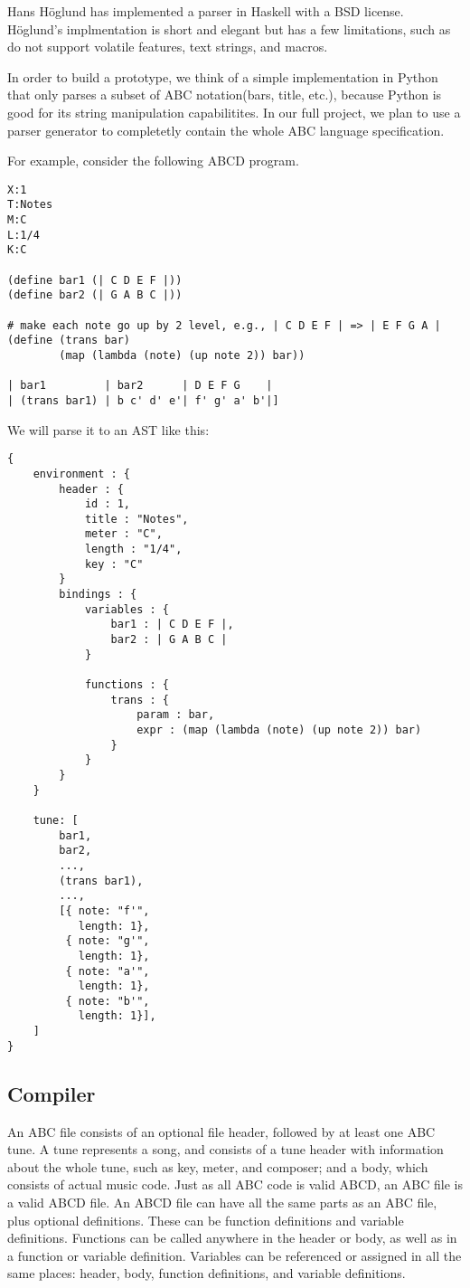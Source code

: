 Hans H\"{o}glund has implemented a parser in Haskell\cite{Hoglund15} with a BSD license. H\"{o}glund's implmentation is short and elegant but has a few limitations, such as do not support volatile features, text strings, and macros.

In order to build a prototype, we think of a simple implementation in Python that only parses a subset of ABC notation(bars, title, etc.), because Python is good for its string manipulation capabilitites. In our full project, we plan to use a parser generator to completetly contain the whole ABC language specification. 

For example, consider the following ABCD program.
\begin{verbatim}
X:1
T:Notes
M:C
L:1/4
K:C

(define bar1 (| C D E F |))
(define bar2 (| G A B C |))

# make each note go up by 2 level, e.g., | C D E F | => | E F G A |
(define (trans bar)
        (map (lambda (note) (up note 2)) bar))

| bar1         | bar2      | D E F G    |
| (trans bar1) | b c' d' e'| f' g' a' b'|]
\end{verbatim}

We will parse it to an AST like this:
\begin{verbatim}
{
    environment : {
        header : {
            id : 1,
            title : "Notes",
            meter : "C",
            length : "1/4",
            key : "C"
        }
        bindings : {
            variables : {
                bar1 : | C D E F |,
                bar2 : | G A B C |
            }

            functions : {
                trans : {
                    param : bar,
                    expr : (map (lambda (note) (up note 2)) bar)
                }
            }
        }
    }

    tune: [
        bar1,
        bar2,
        ...,
        (trans bar1),
        ...,
        [{ note: "f'",
           length: 1},
         { note: "g'",
           length: 1},
         { note: "a'",
           length: 1},
         { note: "b'",
           length: 1}],
    ]
}
\end{verbatim}

\subsection{Compiler}
An ABC file consists of an optional file header, followed by at least one ABC tune. A tune represents a song, and consists of a tune header with information about the whole tune, such as key, meter, and composer; and a body, which consists of actual music code\cite{Walshaw11}. Just as all ABC code is valid ABCD, an ABC file is a valid ABCD file. An ABCD file can have all the same parts as an ABC file, plus optional definitions. These can be function definitions and variable definitions. Functions can be called anywhere in the header or body, as well as in a function or variable definition. Variables can be referenced or assigned in all the same places: header, body, function definitions, and variable definitions.
    
